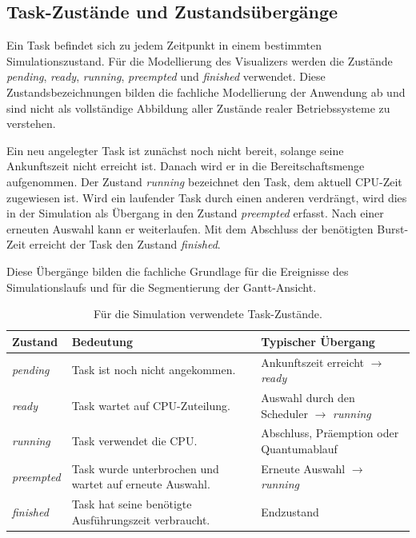 \subsection{Task-Zustände und Zustandsübergänge}

Ein Task befindet sich zu jedem Zeitpunkt in einem bestimmten Simulationszustand. Für die Modellierung des Visualizers werden die Zustände \textit{pending}, \textit{ready}, \textit{running}, \textit{preempted} und \textit{finished} verwendet. Diese Zustandsbezeichnungen bilden die fachliche Modellierung der Anwendung ab und sind nicht als vollständige Abbildung aller Zustände realer Betriebssysteme zu verstehen.

Ein neu angelegter Task ist zunächst noch nicht bereit, solange seine Ankunftszeit nicht erreicht ist. Danach wird er in die Bereitschaftsmenge aufgenommen. Der Zustand \textit{running} bezeichnet den Task, dem aktuell CPU-Zeit zugewiesen ist. Wird ein laufender Task durch einen anderen verdrängt, wird dies in der Simulation als Übergang in den Zustand \textit{preempted} erfasst. Nach einer erneuten Auswahl kann er weiterlaufen. Mit dem Abschluss der benötigten Burst-Zeit erreicht der Task den Zustand \textit{finished}.

Diese Übergänge bilden die fachliche Grundlage für die Ereignisse des Simulationslaufs und für die Segmentierung der Gantt-Ansicht.

\begin{table}[H]
\centering
\caption{Für die Simulation verwendete Task-Zustände.}
\label{tab:taskzustaende}
\small
\begin{tabularx}{\textwidth}{p{}X X}
\textbf{Zustand} & \textbf{Bedeutung} & \textbf{Typischer Übergang} \\
\hline
\textit{pending} & Task ist noch nicht angekommen. & Ankunftszeit erreicht $\rightarrow$ \textit{ready} \\
\textit{ready} & Task wartet auf CPU-Zuteilung. & Auswahl durch den Scheduler $\rightarrow$ \textit{running} \\
\textit{running} & Task verwendet die CPU. & Abschluss, Präemption oder Quantumablauf \\
\textit{preempted} & Task wurde unterbrochen und wartet auf erneute Auswahl. & Erneute Auswahl $\rightarrow$ \textit{running} \\
\textit{finished} & Task hat seine benötigte Ausführungszeit verbraucht. & Endzustand \\
\end{tabularx}
\end{table}

